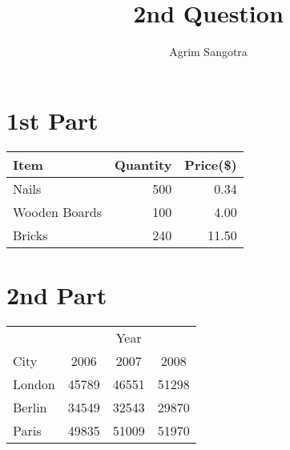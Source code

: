 \documentclass{article}
\title{2nd  Question}
\author{Agrim Sangotra}
\date{}
\begin{document}
\maketitle
\section{1st Part}
\begin{tabular}{l|r|r}
Item & Quantity & Price(\$)\\
\hline
Nails & 500 & 0.34\\
Wooden Boards & 100 & 4.00\\
Bricks & 240 & 11.50\\
\end{tabular}
\section{2nd Part}
\begin{tabular}{l|c c c}
 & &Year& \\
\cline{2-4}
City &2006 & 2007 & 2008\\
\hline
London&45789&46551&51298\\
Berlin&34549&32543&29870\\
Paris&49835&51009&51970\\

\end{tabular}
\end{document}
